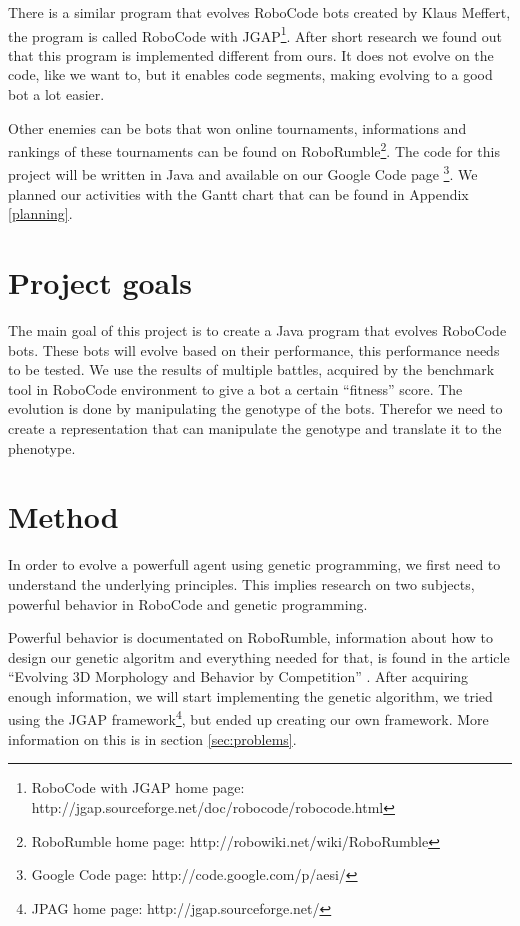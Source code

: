 \documentclass[a4paper,10pt]{article}
\begin{document}
There is a similar program that evolves RoboCode bots created by Klaus Meffert, the program is called RoboCode with JGAP\footnote{RoboCode with JGAP home page: http://jgap.sourceforge.net/doc/robocode/robocode.html}. After short research we found out that this program is implemented different from ours. It does not evolve on the code, like we want to, but it enables code segments, making evolving to a good bot a lot easier.

Other enemies can be bots that won online tournaments, informations and rankings of these tournaments can be found on RoboRumble\footnote{RoboRumble home page: http://robowiki.net/wiki/RoboRumble}.
The code for this project will be written in Java and available on our Google Code page \footnote{Google Code page: http://code.google.com/p/aesi/}.
We planned our activities with the Gantt chart that can be found in Appendix \ref{planning}.

\section{Project goals}
The main goal of this project is to create a Java program that evolves RoboCode bots.
These bots will evolve based on their performance, this performance needs to be tested. We use the results of multiple battles, acquired by the benchmark tool in RoboCode environment to give a bot a certain ``fitness'' score.
The evolution is done by manipulating the genotype of the bots. Therefor we need to create a representation that can manipulate the genotype and translate it to the phenotype.

\section{Method}
In order to evolve a powerfull agent using genetic programming, we first need to understand the underlying principles. This implies research on two subjects, powerful behavior in RoboCode and genetic programming.

Powerful behavior is documentated on RoboRumble, information about how to design our genetic algoritm and everything needed for that, is found in the article ``Evolving 3D Morphology and Behavior by Competition'' \cite{karlsims}.
After acquiring enough information, we will start implementing the genetic algorithm, we tried using the JGAP framework\footnote{JPAG home page: http://jgap.sourceforge.net/}, but ended up creating our own framework. More information on this is in section \ref{sec:problems}.
\end{document}
